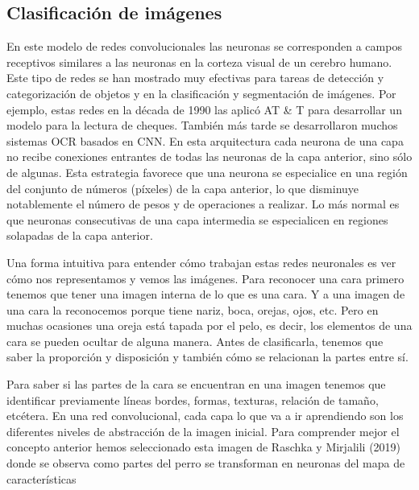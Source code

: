 \documentclass[
  a4paper,
  DIV=11,
  numbers=noendperiod]{scrreprt}
\begin{document}
\subsection{Clasificación de
imágenes}\label{clasificaciuxf3n-de-imuxe1genes}

En este modelo de redes convolucionales las neuronas se corresponden a
campos receptivos similares a las neuronas en la corteza visual de un
cerebro humano. Este tipo de redes se han mostrado muy efectivas para
tareas de detección y categorización de objetos y en la clasificación y
segmentación de imágenes. Por ejemplo, estas redes en la década de 1990
las aplicó AT \& T para desarrollar un modelo para la lectura de
cheques. También más tarde se desarrollaron muchos sistemas OCR basados
en CNN. En esta arquitectura cada neurona de una capa no recibe
conexiones entrantes de todas las neuronas de la capa anterior, sino
sólo de algunas. Esta estrategia favorece que una neurona se especialice
en una región del conjunto de números (píxeles) de la capa anterior, lo
que disminuye notablemente el número de pesos y de operaciones a
realizar. Lo más normal es que neuronas consecutivas de una capa
intermedia se especialicen en regiones solapadas de la capa anterior.

Una forma intuitiva para entender cómo trabajan estas redes neuronales
es ver cómo nos representamos y vemos las imágenes. Para reconocer una
cara primero tenemos que tener una imagen interna de lo que es una cara.
Y a una imagen de una cara la reconocemos porque tiene nariz, boca,
orejas, ojos, etc. Pero en muchas ocasiones una oreja está tapada por el
pelo, es decir, los elementos de una cara se pueden ocultar de alguna
manera. Antes de clasificarla, tenemos que saber la proporción y
disposición y también cómo se relacionan la partes entre sí.

Para saber si las partes de la cara se encuentran en una imagen tenemos
que identificar previamente líneas bordes, formas, texturas, relación de
tamaño, etcétera. En una red convolucional, cada capa lo que va a ir
aprendiendo son los diferentes niveles de abstracción de la imagen
inicial. Para comprender mejor el concepto anterior hemos seleccionado
esta imagen de Raschka y Mirjalili (2019) donde se observa como partes
del perro se transforman en neuronas del mapa de características
\end{document}

